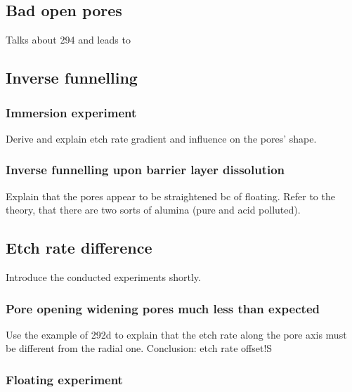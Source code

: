 \documentclass[../thesis.tex]{subfiles}
\begin{document}
        \subsection{Bad open pores}

          Talks about 294 and leads to


        \subsection{Inverse funnelling}

                \subsubsection{Immersion experiment}
                \label{subsec:immersion-experiment}

                  Derive and explain etch rate gradient and influence on the pores' shape.


                \subsubsection{Inverse funnelling upon barrier layer dissolution}
                \label{subsec:pore-opening-effect}

                  Explain that the pores appear to be straightened bc of floating. Refer to the theory, that there are two sorts of alumina (pure and acid  polluted).


        \subsection{Etch rate difference}

                Introduce the conducted experiments shortly.

                \subsubsection{Pore opening widening pores much less than expected}
                \label{subsec:pore-opening-pore-widening}

                  Use the example of 292d to explain that the etch rate along the pore axis must be different from the radial one. Conclusion: etch rate offset!S


                \subsubsection{Floating experiment}
                \label{subsec:floating-experiment}
\end{document}
